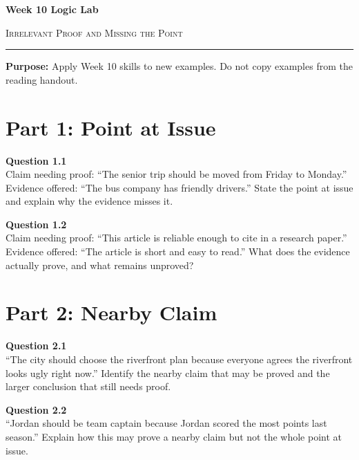 \documentclass[12pt]{article}
\begin{document}
\begin{center}
{\LARGE\bfseries Week 10 Logic Lab}\par\vspace{0.05em}
{\large\scshape Irrelevant Proof and Missing the Point}\par\vspace{0.1em}
\rule{0.78\textwidth}{0.5pt}\par\vspace{0.15em}
\end{center}

\noindent\textbf{Purpose:} Apply Week 10 skills to new examples. Do not copy examples from the reading handout.

\vspace{0.3em}

\section*{Part 1: Point at Issue}

\textbf{Question 1.1}\\[-0.15em]
Claim needing proof: ``The senior trip should be moved from Friday to Monday.'' Evidence offered: ``The bus company has friendly drivers.'' State the point at issue and explain why the evidence misses it.


\textbf{Question 1.2}\\[-0.15em]
Claim needing proof: ``This article is reliable enough to cite in a research paper.'' Evidence offered: ``The article is short and easy to read.'' What does the evidence actually prove, and what remains unproved?


\newpage

\section*{Part 2: Nearby Claim}

\textbf{Question 2.1}\\[-0.15em]
``The city should choose the riverfront plan because everyone agrees the riverfront looks ugly right now.'' Identify the nearby claim that may be proved and the larger conclusion that still needs proof.


\textbf{Question 2.2}\\[-0.15em]
``Jordan should be team captain because Jordan scored the most points last season.'' Explain how this may prove a nearby claim but not the whole point at issue.
\end{document}
